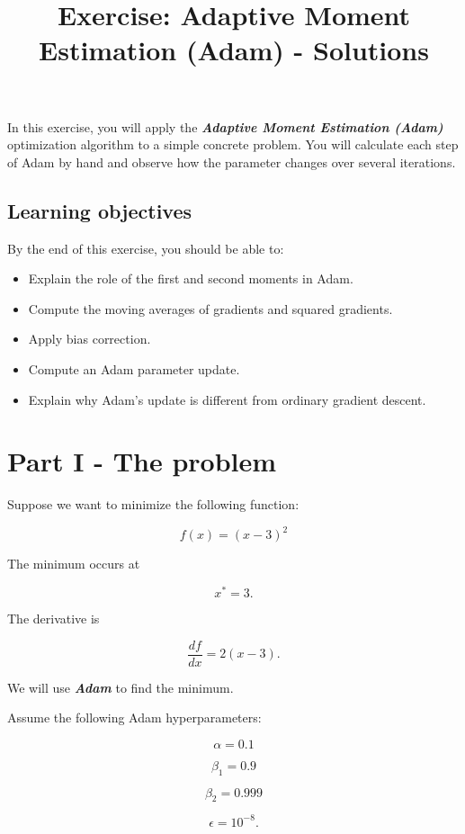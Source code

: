 \documentclass[10pt]{article}
\begin{document}
\title{Exercise: Adaptive Moment Estimation (Adam) - Solutions}
\author{}
\date{}
\maketitle
In this exercise, you will apply the \textbf{\textit{Adaptive Moment Estimation (Adam)}} optimization algorithm to a simple concrete problem. You will calculate each step of Adam by hand and observe how the parameter changes over several iterations.

\subsection*{Learning objectives}
By the end of this exercise, you should be able to:

\begin{itemize}
\item
Explain the role of the first and second moments in Adam.

\item
Compute the moving averages of gradients and squared gradients.

\item
Apply bias correction.

\item
Compute an Adam parameter update.

\item
Explain why Adam's update is different from ordinary gradient descent.

\end{itemize}
\clearpage
\section*{Part I - The problem}
Suppose we want to minimize the following function:

\[
f(x) = (x-3)^2
\]

The minimum occurs at

\[
x^* = 3.
\]

The derivative is

\[
\frac{df}{dx} = 2(x-3).
\]

We will use \textbf{\textit{Adam}} to find the minimum.

Assume the following Adam hyperparameters:

\[
\alpha = 0.1
\]

\[
\beta_1 = 0.9
\]

\[
\beta_2 = 0.999
\]

\[
\epsilon = 10^{-8}.
\]
\end{document}
